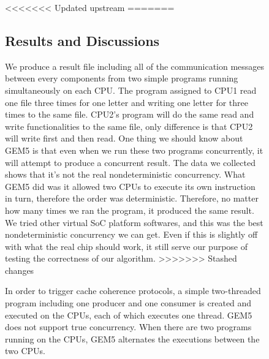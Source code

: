 \documentclass[conference]{IEEEtran}
\begin{document}
\begin{figure}
<<<<<<< Updated upstream
=======
\subsection{Results and Discussions}
We produce a result file including all of the communication messages between every components from two simple programs running simultaneously on each CPU.  The program assigned to CPU1 read one file three times for one letter and writing one letter for three times to the same file. CPU2's program will do the same read and write functionalities to the same file, only difference is that CPU2 will write first and then read. One thing we should know about GEM5 is that even when we run these two programs concurrently, it will attempt to produce a concurrent result. The data we collected shows that it's not the real nondeterministic concurrency. What GEM5 did was it allowed two CPUs to execute its own instruction in turn, therefore the order was deterministic. Therefore, no matter how many times we ran the program, it produced the same result. We tried other virtual SoC platform softwares, and this was the best nondeterministic concurrency we can get. Even if this is slightly off with what the real chip should work, it still serve our purpose of testing the correctness of our algorithm.
>>>>>>> Stashed changes

In order to trigger cache coherence protocols, a simple two-threaded program including one producer and one consumer is created and executed on the CPUs, each of which executes one thread.    GEM5 does not support true concurrency.  When there are two programs running on the CPUs, GEM5 alternates the executions between the two  CPUs.  



\end{figure}
\end{document}
